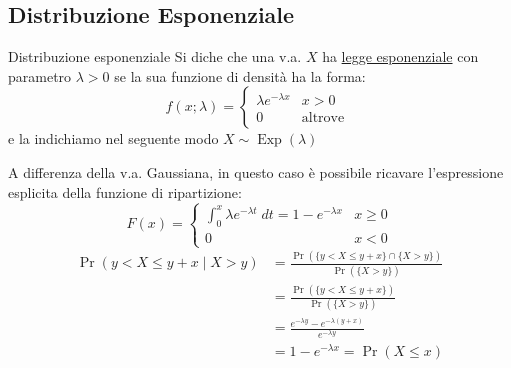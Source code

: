 \subsection{Distribuzione Esponenziale}
\label{vaesponenziale}
\begin{definizione}{Distribuzione esponenziale}
	Si diche che una v.a. $ X $ ha \underline{legge esponenziale} con parametro $  \lambda > 0 $ se la sua funzione di densità ha la forma:
	\[
		f\left(x;
		\lambda \right) = \begin{cases}
			\lambda e^{ -\lambda  x} & x > 0           \\
			0                        & \text{altrove }
		\end{cases}
	\]
	e la  indichiamo nel seguente modo $  X \sim \operatorname{Exp}\left(\lambda\right) $
\end{definizione}
A differenza della v.a. Gaussiana, in questo caso è possibile ricavare l'espressione esplicita della funzione di ripartizione:
\[
	F\left(x\right) =
	\begin{cases}
		\int_{0}^{x} \lambda  e ^{ -\lambda t} \; dt = 1 - e^{ -\lambda  x} & x \ge  0 \\
		0                                                                   & x < 0
	\end{cases}
\]
\[
	\begin{aligned}
		\Pr(y<X \leq y+x \mid X>y) & =\frac{\Pr(\{y<X \leq y+x\} \cap\{X>y\})}{\Pr(\{X>y\})}  \\
		                           & =\frac{\Pr(\{y<X \leq y+x\})}{\Pr(\{X>y\})}              \\
		                           & =\frac{e^{-\lambda y}-e^{-\lambda(y+x)}}{e^{-\lambda y}} \\
		                           & =1-e^{-\lambda x}=\Pr(X \leq x)
	\end{aligned}
\]
